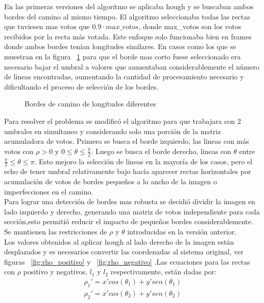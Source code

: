 \documentclass[a4paper,spanish]{article}
\begin{document}
	En las primeras versiones del algoritmo se aplicaba hough  y se buscaban ambos bordes del camino al mismo tiempo. El algoritmo seleccionaba todas las rectas que tuviesen mas votos que $0.9 \cdot max\_votos$, donde max\_votos son los votos recibidos por la recta más votada. Este enfoque solo funcionaba bien en frames donde ambos bordes tenían longitudes similares. En casos como los que se muestran en la figura ~\ref{fig:corridas} para que el borde mas corto fuese seleccionado era necesario bajar el umbral a valores que aumentaban considerablemente el número de lineas encontradas, aumentando la cantidad de procesamiento necesario y dificultando el proceso de selección de los bordes. \\
\begin{figure}[H]
\begin{center}
\caption{Bordes de camino de longitudes diferentes}
\label{fig:corridas}
\end{center}
\end{figure}
Para resolver el problema se modificó el algoritmo para que  trabajara con 2 umbrales en simultaneo y considerando solo una porción de la matriz acumuladora de votos. Primero se busca el borde izquierdo, las lineas con más votos con $\rho > 0 $  y $ 0 \leq \theta \leq \frac{\pi}{2} $. Luego se busca el borde derecho, lineas con $\theta$ entre $ \frac{\pi}{2} \leq \theta \leq \pi  $. Esto mejoro la selección de lineas en la mayoría de los casos, pero el echo de tener umbral relativamente bajo hacía aparecer rectas horizontales por acumulación de votos de bordes pequeños a lo ancho de la imagen o imperfecciones en el camino. \\
	Para lograr una detección de bordes mas robusta se decidió dividir la imagen en lado izquierdo y derecho, generando una matriz de votos independiente para cada sección,esto permitió reducir el impacto de pequeños bordes considerablemente. Se mantienen las restricciones de $\rho$ y $\theta$  introducidas en la versión anterior.\\
Los valores obtenidos al aplicar hough al lado derecho de la imagen están desplazados y es necesarios convertir las coordenadas al sistema original, ver figuras ~\ref{fig:rho_positivo} y ~\ref{fig:rho_negativo} .Las ecuaciones para las rectas con $\rho$ positivo y negativos, $l_1$  y $l_2$ respectivamente, están dadas por:
\begin{align*}
\rho_{1}' = x' cos(\theta_{1}) + y' sen(\theta_{1})\\
\rho_{2}' = x' cos(\theta_{2}) + y' sen(\theta_{2})
\end{align*}
\end{document}
